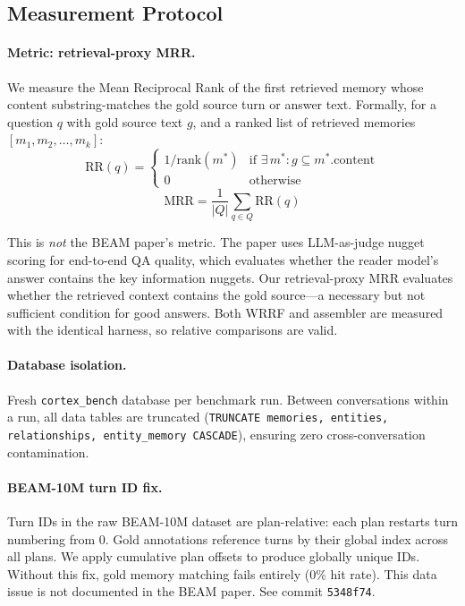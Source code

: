 \documentclass[11pt]{article}
\begin{document}
\subsection{Measurement Protocol}
\label{sec:measurement}

\paragraph{Metric: retrieval-proxy MRR.}
We measure the Mean Reciprocal Rank of the first retrieved memory
whose content substring-matches the gold source turn or answer text.
Formally, for a question $q$ with gold source text $g$, and a ranked
list of retrieved memories $[m_1, m_2, \ldots, m_k]$:
\begin{equation}
\text{RR}(q) =
\begin{cases}
1/\text{rank}(m^*) & \text{if } \exists\, m^* : g \subseteq m^*.\text{content} \\
0 & \text{otherwise}
\end{cases}
\label{eq:rr}
\end{equation}
\begin{equation}
\text{MRR} = \frac{1}{|Q|} \sum_{q \in Q} \text{RR}(q)
\label{eq:mrr}
\end{equation}

This is \emph{not} the BEAM paper's metric.  The paper uses
LLM-as-judge nugget scoring for end-to-end QA quality, which evaluates
whether the reader model's answer contains the key information nuggets.
Our retrieval-proxy MRR evaluates whether the retrieved context
contains the gold source---a necessary but not sufficient condition
for good answers.  Both WRRF and assembler are measured with the
identical harness, so relative comparisons are valid.

\paragraph{Database isolation.}
Fresh \texttt{cortex\_bench} database per benchmark run.  Between
conversations within a run, all data tables are truncated
(\texttt{TRUNCATE memories, entities, relationships, entity\_memory CASCADE}),
ensuring zero cross-conversation contamination.

\paragraph{BEAM-10M turn ID fix.}
Turn IDs in the raw BEAM-10M dataset are plan-relative: each plan
restarts turn numbering from 0.  Gold annotations reference turns by
their global index across all plans.  We apply cumulative plan offsets
to produce globally unique IDs.  Without this fix, gold memory
matching fails entirely (0\% hit rate).  This data issue is not
documented in the BEAM paper.  See commit \texttt{5348f74}.
\end{document}
